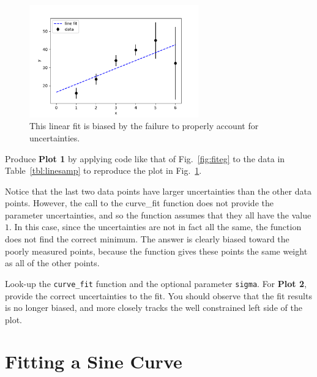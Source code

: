 \begin{figure}[htbp]
\begin{center}
\includegraphics[width=0.65\textwidth]{figs/fitting/bias.pdf} 
\caption{This linear fit is biased by the failure to properly account for uncertainties.}
\label{fig:fitbias}
\end{center}
\end{figure}

Produce {\bf Plot 1} by applying code like that of Fig.~\ref{fig:fiteg}
to the data in Table~\ref{tbl:linesamp} to reproduce the plot in
Fig.~\ref{fig:fitbias}.  

Notice that the last two data points have larger uncertainties than
the other data points.  However, the call to the {curve{\_}fit}
function does not provide the parameter uncertainties, and so the
function assumes that they all have the value $1$.  In this case,
since the uncertainties are not in fact all the same, the function
does not find the correct minimum.  The answer is clearly biased
toward the poorly measured points, because the function gives these
points the same weight as all of the other points.

Look-up the {\tt curve{\_}fit} function and the optional parameter
{\tt sigma}.  For {\bf Plot 2}, provide the correct uncertainties to
the fit.  You should observe that the fit results is no longer biased,
and more closely tracks the well constrained left side of the plot.

\section{Fitting a Sine Curve}

